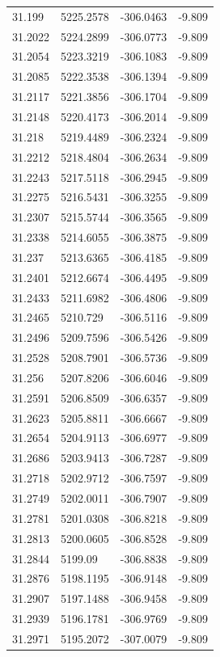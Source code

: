 \begin{table}[H]
\begin{tabular}{llll}
31.199 & 5225.2578 & -306.0463 & -9.809 \\
31.2022 & 5224.2899 & -306.0773 & -9.809 \\
31.2054 & 5223.3219 & -306.1083 & -9.809 \\
31.2085 & 5222.3538 & -306.1394 & -9.809 \\
31.2117 & 5221.3856 & -306.1704 & -9.809 \\
31.2148 & 5220.4173 & -306.2014 & -9.809 \\
31.218 & 5219.4489 & -306.2324 & -9.809 \\
31.2212 & 5218.4804 & -306.2634 & -9.809 \\
31.2243 & 5217.5118 & -306.2945 & -9.809 \\
31.2275 & 5216.5431 & -306.3255 & -9.809 \\
31.2307 & 5215.5744 & -306.3565 & -9.809 \\
31.2338 & 5214.6055 & -306.3875 & -9.809 \\
31.237 & 5213.6365 & -306.4185 & -9.809 \\
31.2401 & 5212.6674 & -306.4495 & -9.809 \\
31.2433 & 5211.6982 & -306.4806 & -9.809 \\
31.2465 & 5210.729 & -306.5116 & -9.809 \\
31.2496 & 5209.7596 & -306.5426 & -9.809 \\
31.2528 & 5208.7901 & -306.5736 & -9.809 \\
31.256 & 5207.8206 & -306.6046 & -9.809 \\
31.2591 & 5206.8509 & -306.6357 & -9.809 \\
31.2623 & 5205.8811 & -306.6667 & -9.809 \\
31.2654 & 5204.9113 & -306.6977 & -9.809 \\
31.2686 & 5203.9413 & -306.7287 & -9.809 \\
31.2718 & 5202.9712 & -306.7597 & -9.809 \\
31.2749 & 5202.0011 & -306.7907 & -9.809 \\
31.2781 & 5201.0308 & -306.8218 & -9.809 \\
31.2813 & 5200.0605 & -306.8528 & -9.809 \\
31.2844 & 5199.09 & -306.8838 & -9.809 \\
31.2876 & 5198.1195 & -306.9148 & -9.809 \\
31.2907 & 5197.1488 & -306.9458 & -9.809 \\
31.2939 & 5196.1781 & -306.9769 & -9.809 \\
31.2971 & 5195.2072 & -307.0079 & -9.809 \\

\end{tabular}
\end{table}
